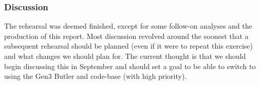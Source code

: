 \subsubsection{Discussion}

The rehearsal was deemed finished, except for some follow-on analyses and
the production of this report.  Most discussion revolved around the soonest that
a subsequent rehearsal should be planned (even if it were to repeat this
exercise) and what changes we should plan for.  The current thought is that we
should begin discussing this in September and should set a goal to be able to
switch to using the Gen3 Butler and code-base (with high priority).




